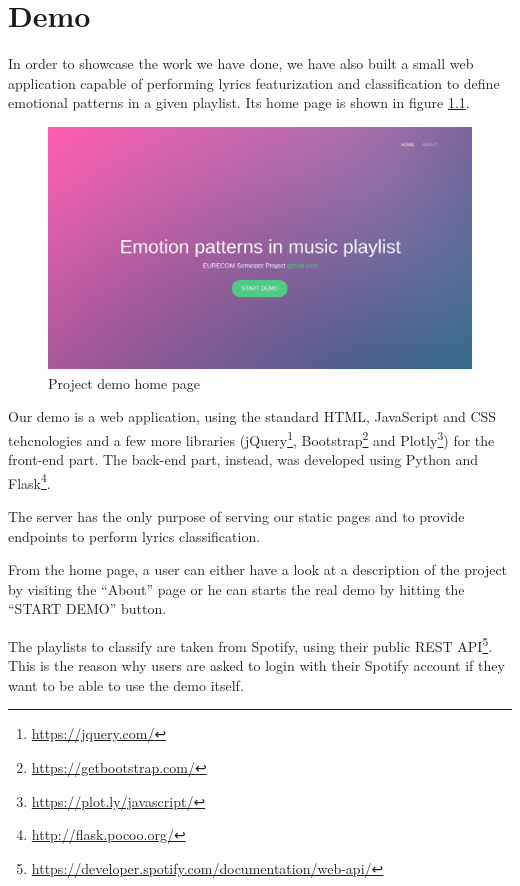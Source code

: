 \chapter{Demo}

In order to showcase the work we have done, we have also built a small web application capable of performing lyrics featurization and classification to define emotional patterns in a given playlist. Its home page is shown in figure \ref{fig:demo-home}.

\begin{figure}[H]
  \centering
  \includegraphics[width=1.0\textwidth]{./chapters/appendix1/images/home-page}
  \caption{Project demo home page}
  \label{fig:demo-home}
\end{figure}

Our demo is a web application, using the standard HTML, JavaScript and CSS tehcnologies and a few more libraries (jQuery\footnote{\url{https://jquery.com/}}, Bootstrap\footnote{\url{https://getbootstrap.com/}} and Plotly\footnote{\url{https://plot.ly/javascript/}}) for the front-end part. The back-end part, instead, was developed using Python and Flask\footnote{\url{http://flask.pocoo.org/}}.

The server has the only purpose of serving our static pages and to provide endpoints to perform lyrics classification.

From the home page, a user can either have a look at a description of the project by visiting the ``About'' page or he can starts the real demo by hitting the ``START DEMO'' button.

The playlists to classify are taken from Spotify, using their public REST API\footnote{\url{https://developer.spotify.com/documentation/web-api/}}. This is the reason why users are asked to login with their Spotify account if they want to be able to use the demo itself.

